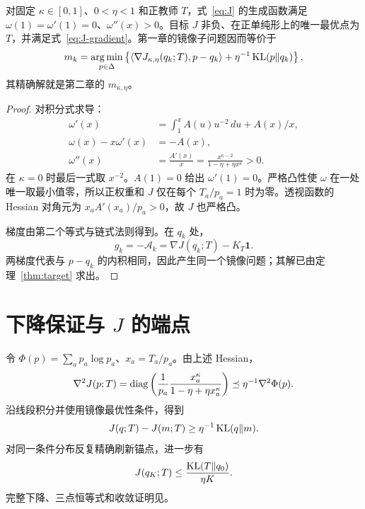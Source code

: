 \begin{theorem}[该镜像步对应的教师目标]
\label{thm:J}
对固定 $\kappa\in[0,1]$、$0<\eta<1$ 和正教师 $T$，式~\eqref{eq:J} 的生成函数满足 $\omega(1)=\omega'(1)=0$、$\omega''(x)>0$。目标 $J$ 非负、在正单纯形上的唯一最优点为 $T$，并满足式~\eqref{eq:J-gradient}。第一章的镜像子问题因而等价于
\begin{equation}
m_k=\operatorname*{arg\,min}_{p\in\Delta}
\left\{\langle\nabla J_{\kappa,\eta}(q_k;T),p-q_k\rangle
+\eta^{-1}\operatorname{KL}(p\Vert q_k)\right\},
\end{equation}
其精确解就是第二章的 $m_{\kappa,\eta}$。
\end{theorem}
\begin{proof}
对积分式求导：
\begin{align}
\omega'(x)&=\int_1^xA(u)u^{-2}\,du+A(x)/x,\\
\omega(x)-x\omega'(x)&=-A(x),\\
\omega''(x)&=\frac{A'(x)}x
=\frac{x^{\kappa-2}}{1-\eta+\eta x^\kappa}>0.
\end{align}
在 $\kappa=0$ 时最后一式取 $x^{-2}$。$A(1)=0$ 给出 $\omega'(1)=0$。严格凸性使 $\omega$ 在一处唯一取最小值零，所以正权重和 $J$ 仅在每个 $T_a/p_a=1$ 时为零。透视函数的 Hessian 对角元为 $x_aA'(x_a)/p_a>0$，故 $J$ 也严格凸。

梯度由第二个等式与链式法则得到。在 $q_k$ 处，
\begin{equation}
g_k=-\mathcal A_k=\nabla J(q_k;T)-K_T\mathbf1.
\end{equation}
两梯度代表与 $p-q_k$ 的内积相同，因此产生同一个镜像问题；其解已由定理~\ref{thm:target} 求出。
\end{proof}

\section{下降保证与 \texorpdfstring{$J$}{J} 的端点}
令 $\Phi(p)=\sum_ap_a\log p_a$、$x_a=T_a/p_a$。由上述 Hessian，
\begin{equation}
\nabla^2J(p;T)
=\operatorname{diag}\left(\frac1{p_a}\frac{x_a^\kappa}{1-\eta+\eta x_a^\kappa}\right)
\preceq\eta^{-1}\nabla^2\Phi(p).
\label{eq:relative-smooth}
\end{equation}
沿线段积分并使用镜像最优性条件，得到
\begin{equation}
J(q;T)-J(m;T)\ge\eta^{-1}\operatorname{KL}(q\Vert m).
\end{equation}
对同一条件分布反复精确刷新锚点，进一步有
\begin{equation}
J(q_K;T)\le\frac{\operatorname{KL}(T\Vert q_0)}{\eta K}.
\label{eq:J-rate}
\end{equation}
完整下降、三点恒等式和收敛证明见。

